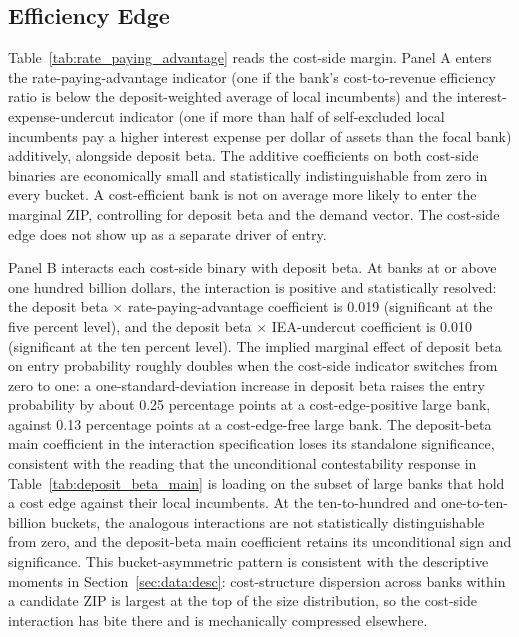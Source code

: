 \subsection{Efficiency Edge}
\label{sec:results:efficiency}

Table~\ref{tab:rate_paying_advantage} reads the cost-side margin. Panel A enters the rate-paying-advantage indicator (one if the bank's cost-to-revenue efficiency ratio is below the deposit-weighted average of local incumbents) and the interest-expense-undercut indicator (one if more than half of self-excluded local incumbents pay a higher interest expense per dollar of assets than the focal bank) additively, alongside deposit beta. The additive coefficients on both cost-side binaries are economically small and statistically indistinguishable from zero in every bucket. A cost-efficient bank is not on average more likely to enter the marginal ZIP, controlling for deposit beta and the demand vector. The cost-side edge does not show up as a separate driver of entry.

Panel B interacts each cost-side binary with deposit beta. At banks at or above one hundred billion dollars, the interaction is positive and statistically resolved: the deposit beta $\times$ rate-paying-advantage coefficient is 0.019 (significant at the five percent level), and the deposit beta $\times$ IEA-undercut coefficient is 0.010 (significant at the ten percent level). The implied marginal effect of deposit beta on entry probability roughly doubles when the cost-side indicator switches from zero to one: a one-standard-deviation increase in deposit beta raises the entry probability by about 0.25 percentage points at a cost-edge-positive large bank, against 0.13 percentage points at a cost-edge-free large bank. The deposit-beta main coefficient in the interaction specification loses its standalone significance, consistent with the reading that the unconditional contestability response in Table~\ref{tab:deposit_beta_main} is loading on the subset of large banks that hold a cost edge against their local incumbents. At the ten-to-hundred and one-to-ten-billion buckets, the analogous interactions are not statistically distinguishable from zero, and the deposit-beta main coefficient retains its unconditional sign and significance. This bucket-asymmetric pattern is consistent with the descriptive moments in Section~\ref{sec:data:desc}: cost-structure dispersion across banks within a candidate ZIP is largest at the top of the size distribution, so the cost-side interaction has bite there and is mechanically compressed elsewhere.

